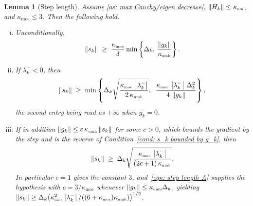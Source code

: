 \documentclass[11pt]{article}
\theoremstyle{plain}
\newtheorem{lemma}[theorem]{Lemma}
\theoremstyle{definition}
\theoremstyle{remark}
\numberwithin{equation}{section}
\newcommand*\mykappa[1]{\kappa_{\scriptscriptstyle\text{#1}}}
\begin{document}
\begin{lemma}[Step length]
\label{lem: step length}
    Assume \ref{as: max Cauchy/eigen decrease}, $\norm{H_k} \leq \mykappa{umh}$ and
    $\mykappa{moc} \leq 3$. Then the following hold.
    \begin{enumerate}[(i)]
        \item Unconditionally,
        \begin{equation}
            \norm{s_k} \;\geq\; \frac{\mykappa{moc}}{3}
                \min\left\{\Delta_k,\, \frac{\norm{g_k}}{\mykappa{umh}}\right\}.
            \label{eqn: step length A}
        \end{equation}

        \item If $\lambda_k^- < 0$, then
        \begin{equation}
            \norm{s_k} \;\geq\;
            \min\left\{
              \Delta_k \sqrt{\frac{\mykappa{moc}\,\abs{\lambda_k^-}}{2\,\mykappa{umh}}},\;\;
              \frac{\mykappa{moc}\,\abs{\lambda_k^-}\,\Delta_k^2}{4\,\norm{g_k}}
            \right\},
            \label{eqn: step length C}
        \end{equation}
        the second entry being read as $+\infty$ when $g_k = 0$.

        \item If in addition $\norm{g_k} \leq c\,\mykappa{umh}\norm{s_k}$ for some $c > 0$, which
        bounds the \emph{gradient} by the step and is the reverse of
        Condition~\ref{cond: s_k bounded by g_k}, then
        \begin{equation}
            \norm{s_k} \;\geq\; \Delta_k
                \sqrt{\frac{\mykappa{moc}\,\abs{\lambda_k^-}}{(2c+1)\,\mykappa{umh}}} .
            \label{eqn: step length B}
        \end{equation}
        In particular $c = 1$ gives the constant $3$, and~\eqref{eqn: step length A} supplies the
        hypothesis with $c = 3/\mykappa{moc}$ whenever $\norm{g_k} \leq \mykappa{umh}\Delta_k$,
        yielding
        $\norm{s_k} \geq \Delta_k\bigl(\mykappa{moc}^2\abs{\lambda_k^-}
        /((6+\mykappa{moc})\mykappa{umh})\bigr)^{1/2}$.
    \end{enumerate}
\end{lemma}
\end{document}
